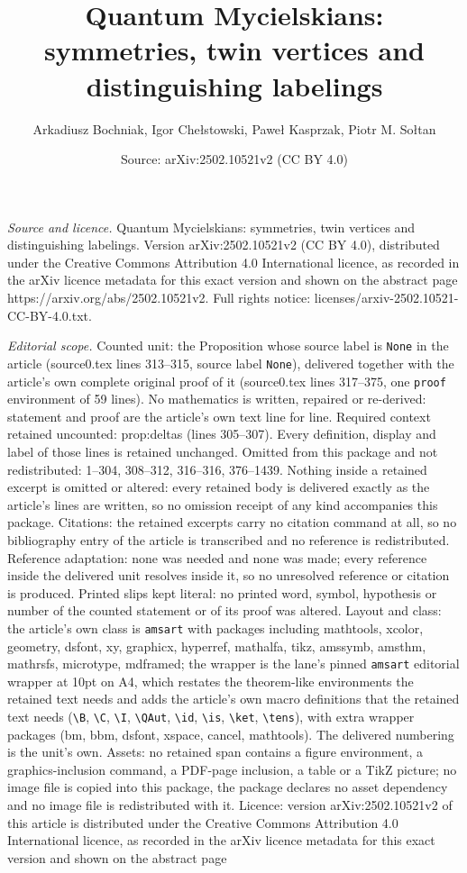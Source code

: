 \documentclass[10pt,a4paper]{amsart}
\title[Quantum Mycielskians: symmetries, twin vertices and distingu]{Quantum Mycielskians: symmetries, twin vertices and distinguishing labelings}
\author{Arkadiusz Bochniak, Igor Che{\l}stowski, Pawe{\l} Kasprzak, Piotr M. So{\l}tan}
\date{Source: arXiv:2502.10521v2 (CC BY 4.0)}
\begin{document}
\maketitle

\noindent\emph{Source and licence.} Quantum Mycielskians: symmetries, twin vertices and distinguishing labelings. Version arXiv:2502.10521v2 (CC BY 4.0), distributed under the Creative Commons Attribution 4.0 International licence, as recorded in the arXiv licence metadata for this exact version and shown on the abstract page https://arxiv.org/abs/2502.10521v2. Full rights notice: licenses/arxiv-2502.10521-CC-BY-4.0.txt.\par\smallskip

\noindent\textit{Editorial scope.} Counted unit: the Proposition whose source label is \texttt{None} in the article (source0.tex lines 313--315, source label \texttt{None}), delivered together with the article's own complete original proof of it (source0.tex lines 317--375, one \texttt{proof} environment of 59 lines). No mathematics is written, repaired or re-derived: statement and proof are the article's own text line for line. Required context retained uncounted: prop:deltas (lines 305--307). Every definition, display and label of those lines is retained unchanged. Omitted from this package and not redistributed: 1--304, 308--312, 316--316, 376--1439. Nothing inside a retained excerpt is omitted or altered: every retained body is delivered exactly as the article's lines are written, so no omission receipt of any kind accompanies this package. Citations: the retained excerpts carry no citation command at all, so no bibliography entry of the article is transcribed and no reference is redistributed. Reference adaptation: none was needed and none was made; every reference inside the delivered unit resolves inside it, so no unresolved reference or citation is produced. Printed slips kept literal: no printed word, symbol, hypothesis or number of the counted statement or of its proof was altered. Layout and class: the article's own class is \texttt{amsart} with packages including mathtools, xcolor, geometry, dsfont, xy, graphicx, hyperref, mathalfa, tikz, amssymb, amsthm, mathrsfs, microtype, mdframed; the wrapper is the lane's pinned \texttt{amsart} editorial wrapper at 10pt on A4, which restates the theorem-like environments the retained text needs and adds the article's own macro definitions that the retained text needs (\texttt{\textbackslash B}, \texttt{\textbackslash C}, \texttt{\textbackslash I}, \texttt{\textbackslash QAut}, \texttt{\textbackslash id}, \texttt{\textbackslash is}, \texttt{\textbackslash ket}, \texttt{\textbackslash tens}), with extra wrapper packages (bm, bbm, dsfont, xspace, cancel, mathtools). The delivered numbering is the unit's own. Assets: no retained span contains a figure environment, a graphics-inclusion command, a PDF-page inclusion, a table or a TikZ picture; no image file is copied into this package, the package declares no asset dependency and no image file is redistributed with it. Licence: version arXiv:2502.10521v2 of this article is distributed under the Creative Commons Attribution 4.0 International licence, as recorded in the arXiv licence metadata for this exact version and shown on the abstract page 
\end{document}
